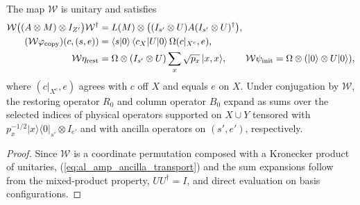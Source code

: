 \begin{lemma}
    \label{thm:al_amp_ancilla_transport}
    \leanok
    The map $\mathcal W$ is unitary and satisfies
    \begin{align}
        \mathcal W\bigl((A\otimes M)\otimes I_{Z'}\bigr)\mathcal W^\dagger
         & =L(M)\otimes\bigl((I_{s'}\otimes U)A(I_{s'}\otimes U)^\dagger\bigr), \notag \\
        (\mathcal W\varphi_{\rm copy})(c,(s,e))
         & =\langle s|0\rangle\,\langle c_X|U|0\rangle\,\Omega(c|_{X^c},e), \notag     \\
        \mathcal W\eta_{\rm rest}
         & =\Omega\otimes(I_{s'}\otimes U)\sum_x\sqrt{p_x}\,|x,x\rangle,
        \qquad
        \mathcal W\psi_{\rm init}=\Omega\otimes(|0\rangle\otimes U|0\rangle),
        \label{eq:al_amp_ancilla_transport}
    \end{align}
    where $(c|_{X^c},e)$ agrees with $c$ off $X$ and equals $e$ on $X$. Under
    conjugation by $\mathcal W$, the restoring operator $R_0$ and column
    operator $B_0$ expand as sums over the selected indices of physical
    operators supported on $X\cup Y$ tensored with
    $p_x^{-1/2}|x\rangle\langle0|_{s'}\otimes I_{e'}$ and with ancilla
    operators on $(s',e')$, respectively.
\end{lemma}
\begin{proof}
    \leanok
    Since $\mathcal W$ is a coordinate permutation composed with a Kronecker
    product of unitaries, (\ref{eq:al_amp_ancilla_transport}) and the sum
    expansions follow from the mixed-product property, $UU^\dagger=I$, and
    direct evaluation on basis configurations.
\end{proof}

